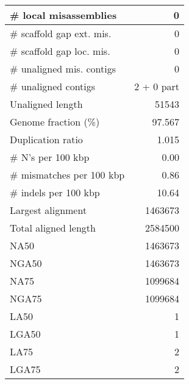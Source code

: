 \documentclass[12pt,a4paper]{article}
\begin{document}
\begin{table}[ht]
\begin{center}
\begin{tabular}{|l*{1}{|r}|}
\# local misassemblies & 0 \\ \hline
\# scaffold gap ext. mis. & 0 \\ \hline
\# scaffold gap loc. mis. & 0 \\ \hline
\# unaligned mis. contigs & 0 \\ \hline
\# unaligned contigs & 2 + 0 part \\ \hline
Unaligned length & 51543 \\ \hline
Genome fraction (\%) & 97.567 \\ \hline
Duplication ratio & 1.015 \\ \hline
\# N's per 100 kbp & 0.00 \\ \hline
\# mismatches per 100 kbp & 0.86 \\ \hline
\# indels per 100 kbp & 10.64 \\ \hline
Largest alignment & 1463673 \\ \hline
Total aligned length & 2584500 \\ \hline
NA50 & 1463673 \\ \hline
NGA50 & 1463673 \\ \hline
NA75 & 1099684 \\ \hline
NGA75 & 1099684 \\ \hline
LA50 & 1 \\ \hline
LGA50 & 1 \\ \hline
LA75 & 2 \\ \hline
LGA75 & 2 \\ \hline
\end{tabular}
\end{center}
\end{table}
\end{document}
